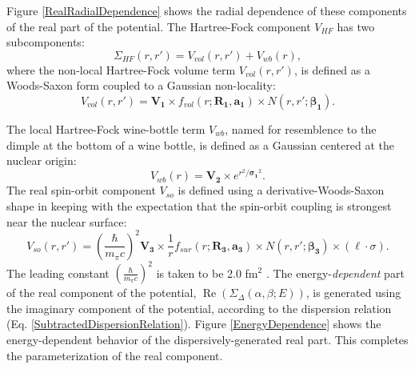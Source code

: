 Figure \ref{RealRadialDependence} shows the radial dependence of these
components of the real part of the potential.
The Hartree-Fock component $V_{HF}$ has two subcomponents:
\begin{equation} \label{HFWBEquation}
    \Sigma_{HF}(r,r') = V_{vol}(r,r') + V_{wb}(r),
\end{equation}
where the non-local Hartree-Fock volume term $V_{vol}(r,r')$, is defined as
a Woods-Saxon form coupled to a Gaussian non-locality:
\begin{equation} \label{RealVolume}
    V_{vol}(r,r') = \bm{V_{1}}{\times}f_{vol}(r; \bm{R_{1}}, \bm{a_{1}})
    {\times}N(r,r';\bm{\beta_{1}}).
\end{equation}

The local Hartree-Fock wine-bottle
term $V_{wb}$, named for resemblence to the dimple at the bottom of a wine
bottle, is defined as a Gaussian centered at the nuclear origin:
\begin{equation}
    V_{wb}(r) = \bm{V_{2}}{\times}e^{r^{2}/\bm{\sigma_{1}}^{2}}.
\end{equation}
The real spin-orbit component $V_{so}$
is defined using a derivative-Woods-Saxon shape in keeping with the
expectation that the spin-orbit coupling is strongest near the
nuclear surface:
\begin{equation} \label{RealSOEquation}
    V_{so}(r,r') = \left(\frac{\hbar}{m_{\pi}c}\right)^{2}
    \bm{V_{3}}\times\frac{1}{r}f_{sur}(r;\bm{R_{3}}, \bm{a_{3}}){\times}N(r,r';\bm{\beta_{3}})
    {\times}(\ell\cdot\sigma).
\end{equation}
The leading constant $\left(\frac{\hbar}{m_{\pi}c}\right)^{2}$ is taken to be 2.0 fm$^{2}$
\cite{MahzoonPhDThesis}.
The energy-\textit{dependent} part of the real component of the potential,
$\operatorname{Re}(\Sigma_{\Delta}(\alpha,\beta;E))$, is generated
using the imaginary component of the potential, according to the dispersion relation (Eq.
\ref{SubtractedDispersionRelation}). Figure \ref{EnergyDependence} shows the
energy-dependent behavior of the dispersively-generated real part.
This completes the parameterization of the real component.

